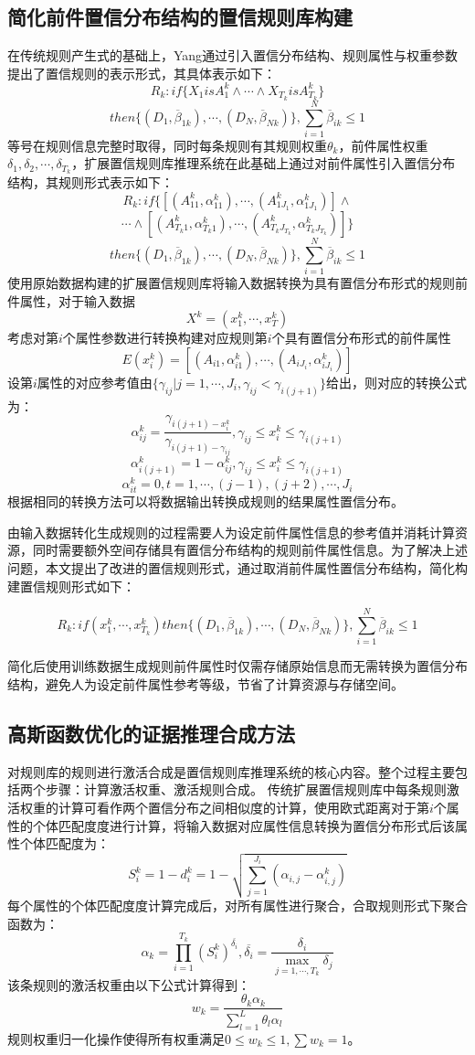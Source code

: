 \documentclass{cjc}
\begin{document}
\subsection{简化前件置信分布结构的置信规则库构建}
在传统规则产生式的基础上，Yang\cite{a3}通过引入置信分布结构、规则属性与权重参数提出了置信规则的表示形式，其具体表示如下：
$$R_k:if\{X_1isA_1^k \wedge \cdots \wedge X_{T_k}isA_{T_k}^k\}$$
$$then\{(D_1,\overline{\beta}_{1k}),\cdots,(D_N,\overline{\beta}_{Nk})\},\sum_{i=1}^N\overline{\beta}_{ik}\leq1$$
等号在规则信息完整时取得，同时每条规则有其规则权重$\theta_k$，前件属性权重$\delta_{1},\delta_{2},\cdots,\delta_{T_k}$，扩展置信规则库推理系统在此基础上通过对前件属性引入置信分布结构，其规则形式表示如下：
$$R_k:if\{[(A_{11}^k,\alpha_{11}^k),\cdots,(A_{1J_1}^k,\alpha_{1J_1}^k)] \wedge $$
$$\cdots \wedge [(A_{T_k1}^k,\alpha_{T_k1}^k), \cdots,(A_{T_kJ_{T_k}}^k,\alpha_{T_kJ_{T_k}}^k)]\}$$
$$then\{(D_1,\overline{\beta}_{1k}),\cdots,(D_N,\overline{\beta}_{Nk})\},\sum_{i=1}^N\overline{\beta}_{ik}\leq1$$
使用原始数据构建的扩展置信规则库将输入数据转换为具有置信分布形式的规则前件属性，对于输入数据
$$X^k=(x_1^k,\cdots,x_T^k)$$
考虑对第$i$个属性参数进行转换构建对应规则第$i$个具有置信分布形式的前件属性
$$E(x_i^k)=[(A_{i1},\alpha_{i1}^k),\cdots,(A_{iJ_i},\alpha_{iJ_i}^k)]$$
设第$i$属性的对应参考值由$\{\gamma_{ij}|j=1,\cdots,J_i,\gamma_{ij}<\gamma_{i(j+1)}\}$给出，则对应的转换公式为：
$$\alpha_{ij}^k=\frac{\gamma_{i(j+1)-x_i^k}}{\gamma_{i(j+1)-\gamma_{ij}}},\gamma_{ij}\leq x_i^k\leq \gamma_{i(j+1)}$$
$$\alpha_{i(j+1)}^k=1-\alpha_{ij}^k,\gamma_{ij}\leq x_i^k\leq \gamma_{i(j+1)}$$
$$\alpha_{it}^k=0,t=1,\cdots,(j-1),(j+2),\cdots,J_i$$
根据相同的转换方法可以将数据输出转换成规则的结果属性置信分布。

由输入数据转化生成规则的过程需要人为设定前件属性信息的参考值并消耗计算资源，同时需要额外空间存储具有置信分布结构的规则前件属性信息。为了解决上述问题，本文提出了改进的置信规则形式，通过取消前件属性置信分布结构，简化构建置信规则形式如下：
\begin{small}
	$$R_k:if(x_1^k , \cdots , x_{T_k}^k)then\{(D_1,\overline{\beta}_{1k}),\cdots,(D_N,\overline{\beta}_{Nk})\},\sum_{i=1}^N\overline{\beta}_{ik}\leq1$$	
\end{small}
简化后使用训练数据生成规则前件属性时仅需存储原始信息而无需转换为置信分布结构，避免人为设定前件属性参考等级，节省了计算资源与存储空间。
\subsection{高斯函数优化的证据推理合成方法}
对规则库的规则进行激活合成是置信规则库推理系统的核心内容。整个过程主要包括两个步骤：计算激活权重、激活规则合成。
传统扩展置信规则库中每条规则激活权重的计算可看作两个置信分布之间相似度的计算，使用欧式距离对于第$i$个属性的个体匹配度度进行计算，将输入数据对应属性信息转换为置信分布形式后该属性个体匹配度为：
$$S_i^k=1-d_i^k=1-\sqrt{\sum_{j=1}^{J_i}(\alpha_{i,j}-\alpha_{i,j}^k)}$$
每个属性的个体匹配度度计算完成后，对所有属性进行聚合，合取规则形式下聚合函数为：
$$\alpha_k=\prod_{i=1}^{T_k}(S_i^k)^{\overline{\delta_i}},\overline{\delta_i}=\frac{\delta_i}{\max_{j=1,\cdots,T_k}\delta_j}$$
该条规则的激活权重由以下公式计算得到：
$$w_k=\frac{\theta_k\alpha_k}{\sum_{l=1}^L\theta_l\alpha_l}$$
规则权重归一化操作使得所有权重满足$0\leq w_k\leq 1,\sum w_k=1$。
\end{document}
